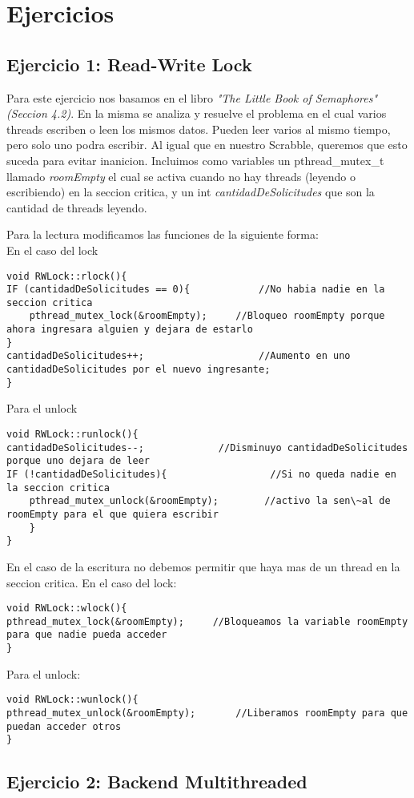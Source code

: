 \section{Ejercicios}

\subsection{Ejercicio 1: Read-Write Lock}
Para este ejercicio nos basamos en el libro \textit{"The Little Book of Semaphores" (Seccion 4.2)}. En la misma se analiza y resuelve el problema en el cual varios threads escriben o leen los mismos datos. Pueden leer varios al mismo tiempo, pero solo uno podra escribir.
Al igual que en nuestro Scrabble, queremos que esto suceda para evitar inanicion.
Incluimos como variables un pthread\_mutex\_t llamado \textit{roomEmpty} el cual se activa cuando no hay threads (leyendo o escribiendo) en la seccion critica, y un int \textit{cantidadDeSolicitudes} que son la cantidad de threads leyendo.

Para la lectura modificamos las funciones de la siguiente forma:\\
En el caso del lock

\begin{verbatim}
void RWLock::rlock(){
IF (cantidadDeSolicitudes == 0){			//No habia nadie en la seccion critica
    pthread_mutex_lock(&roomEmpty);		//Bloqueo roomEmpty porque ahora ingresara alguien y dejara de estarlo
}
cantidadDeSolicitudes++;					//Aumento en uno cantidadDeSolicitudes por el nuevo ingresante;
}
\end{verbatim}

Para el unlock
\begin{verbatim}
void RWLock::runlock(){
cantidadDeSolicitudes--;	         //Disminuyo cantidadDeSolicitudes porque uno dejara de leer
IF (!cantidadDeSolicitudes){	              //Si no queda nadie en la seccion critica
    pthread_mutex_unlock(&roomEmpty);        //activo la sen\~al de roomEmpty para el que quiera escribir
	}
}
\end{verbatim}

En el caso de la escritura no debemos permitir que haya mas de un thread en la seccion critica.
 En el caso del lock:
 
\begin{verbatim}
void RWLock::wlock(){
pthread_mutex_lock(&roomEmpty);		//Bloqueamos la variable roomEmpty para que nadie pueda acceder
}
\end{verbatim}

Para el unlock:
\begin{verbatim}
void RWLock::wunlock(){
pthread_mutex_unlock(&roomEmpty);		//Liberamos roomEmpty para que puedan acceder otros
}
\end{verbatim}







\subsection{Ejercicio 2: Backend Multithreaded}
